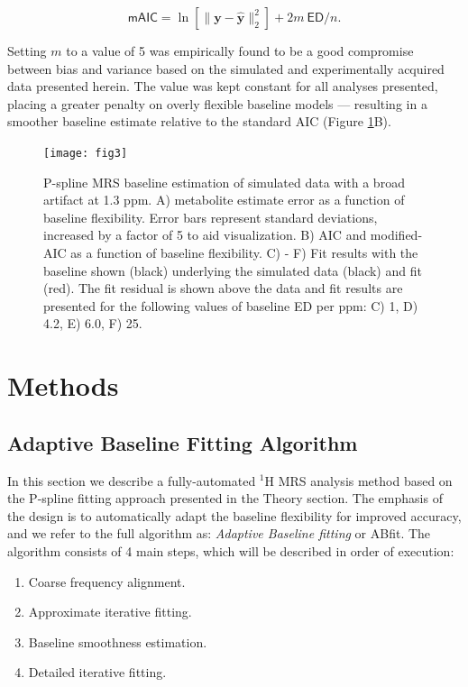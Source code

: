 \documentclass[num-refs]{wiley-article}
\begin{document}
\begin{equation}
  \textsf{mAIC} = \ln \left[ \|\mathbf{y} - \hat{\mathbf{y}}\|^{2}_{2} \right] + 2 m \ \textsf{ED} / n.
  \label{maic}
\end{equation}

Setting $m$ to a value of 5 was empirically found to be a good compromise between bias and variance based on the simulated and experimentally acquired data presented herein. The value was kept constant for all  analyses presented, placing a greater penalty on overly flexible baseline models --- resulting in a smoother baseline estimate relative to the standard AIC (Figure \ref{mrs_bl_simple}B).

\begin{figure}
  \begin{center}
    \texttt{[image: fig3]}
    \caption{P-spline MRS baseline estimation of simulated data with a broad artifact at 1.3 ppm. A) metabolite estimate error as a function of baseline flexibility. Error bars represent standard deviations, increased by a factor of 5 to aid visualization. B) AIC and modified-AIC as a function of baseline flexibility. C) - F) Fit results with the baseline shown (black) underlying the simulated data (black) and fit (red). The fit residual is shown above the data and fit results are presented for the following values of baseline ED per ppm: C) 1, D) 4.2, E) 6.0, F) 25.}
    \label{mrs_bl_simple}
  \end{center}
\end{figure}

\section{Methods}
\subsection{Adaptive Baseline Fitting Algorithm}
In this section we describe a fully-automated $^1\mathrm{H}$ MRS analysis method based on the P-spline fitting approach presented in the Theory section. The emphasis of the design is to automatically adapt the baseline flexibility for improved accuracy, and we refer to the full algorithm as: \textit{Adaptive Baseline fitting} or ABfit. The algorithm consists of 4 main steps, which will be described in order of execution:

\begin{enumerate}
  \item Coarse frequency alignment.
  \item Approximate iterative fitting.
  \item Baseline smoothness estimation.
  \item Detailed iterative fitting.
\end{enumerate}
\end{document}
